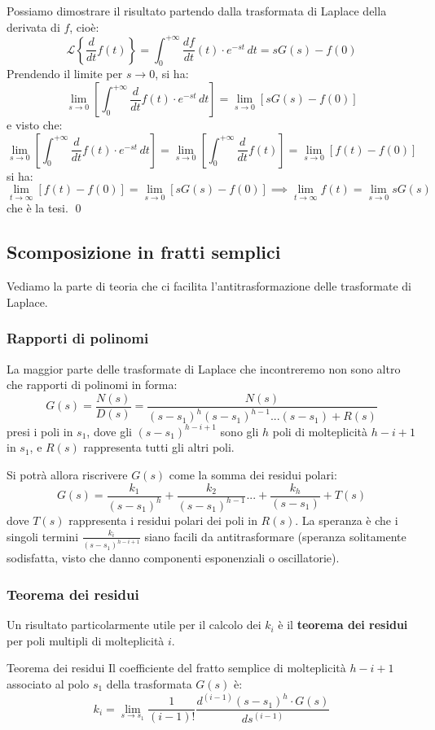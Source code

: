 \documentclass[a4paper,11pt]{article}
\begin{document}
Possiamo dimostrare il risultato partendo dalla trasformata di Laplace della derivata di $f$, cioè:
$$
\mathcal{L}\left\{ \frac{d}{dt}f(t) \right\} = \int_0^{+\infty} \frac{df}{dt}(t) \cdot e^{-st} \, dt = sG(s) - f(0)
$$
Prendendo il limite per $s \rightarrow 0$, si ha:
$$
\lim_{s \rightarrow 0} \left[ \int_0^{+\infty} \frac{d}{dt}f(t) \cdot e^{-st} \, dt \right] = \lim_{s \rightarrow 0} \left[ sG(s) - f(0) \right] 
$$
e visto che:
$$
\lim_{s \rightarrow 0} \left[ \int_0^{+\infty} \frac{d}{dt}f(t) \cdot e^{-st} \, dt \right] = \lim_{s \rightarrow 0} \left[ \int_0^{+\infty} \frac{d}{dt} f(t) \right] = \lim_{s \rightarrow 0} \left[ f(t) - f(0) \right]
$$
si ha:
$$
\lim_{t \rightarrow \infty} \left[ f(t) - f(0) \right] = \lim_{s \rightarrow 0} \left[ sG(s) - f(0) \right] 
\implies 
\lim_{t \rightarrow \infty} f(t) = \lim_{s \rightarrow 0} sG(s) 
$$
che è la tesi. \qed

\subsection{Scomposizione in fratti semplici}
Vediamo la parte di teoria che ci facilita l'antitrasformazione delle trasformate di Laplace.

\subsubsection{Rapporti di polinomi}
La maggior parte delle trasformate di Laplace che incontreremo non sono altro che rapporti di polinomi in forma:
$$
G(s) = \frac{N(s)}{D(s)} = \frac{N(s)}{(s - s_1)^h (s - s_1)^{h - 1} ... (s - s_1) + R(s)}
$$
presi i poli in $s_1$, dove gli $(s - s_1)^{h - i + 1}$ sono gli $h$ poli di molteplicità $h - i + 1$ in $s_1$, e $R(s)$ rappresenta tutti gli altri poli.

Si potrà allora riscrivere $G(s)$ come la somma dei residui polari:
$$
G(s) = \frac{k_1}{(s - s_1)^h} + \frac{k_2}{(s - s_1)^{h - 1}} ... + \frac{k_h}{(s - s_1)} + T(s)
$$
dove $T(s)$ rappresenta i residui polari dei poli in $R(s)$.
La speranza è che i singoli termini $\frac{k_i}{(s - s_1)^{h - i + 1}}$ siano facili da antitrasformare (speranza solitamente sodisfatta, visto che danno componenti esponenziali o oscillatorie).

\subsubsection{Teorema dei residui}
Un risultato particolarmente utile per il calcolo dei $k_i$ è il \textbf{teorema dei residui} per poli multipli di molteplicità $i$.
\begin{theorem}{Teorema dei residui}
Il coefficiente del fratto semplice di molteplicità $h - i + 1$ associato al polo $s_1$ della trasformata $G(s)$ è:	
$$
k_i = \lim_{s \rightarrow s_1} \frac{1}{(i - 1)!} \frac{d^{(i - 1)} (s - s_1)^h \cdot G(s) }{ds^{(i - 1)}}
$$
\end{theorem}
\end{document}
